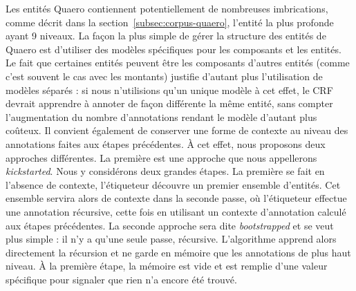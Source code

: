 \documentclass[12pt,a4paper,times,twoside,openright]{report}
\begin{document}
Les entités Quaero contiennent potentiellement de nombreuses imbrications, comme décrit dans la section\ \ref{subsec:corpus-quaero}, l'entité la plus profonde ayant 9 niveaux. La façon la plus simple de gérer la structure des entités de Quaero est d'utiliser des modèles spécifiques pour les composants et les entités. Le fait que certaines entités peuvent être les composants d'autres entités (comme c'est souvent le cas avec les montants) justifie d'autant plus l'utilisation de modèles séparés : si nous n'utilisions qu'un unique modèle à cet effet, le CRF devrait apprendre à annoter de façon différente la même entité, sans compter l'augmentation du nombre d'annotations rendant le modèle d'autant plus coûteux. Il convient également de conserver une forme de contexte au niveau des annotations faites aux étapes précédentes. À cet effet, nous proposons deux approches différentes. La première est une approche que nous appellerons \emph{kickstarted}. Nous y considérons deux grandes étapes. La première se fait en l'absence de contexte, l'étiqueteur découvre un premier ensemble d'entités. Cet ensemble servira alors de contexte dans la seconde passe, où l'étiqueteur effectue une annotation récursive, cette fois en utilisant un contexte d'annotation calculé aux étapes précédentes. La seconde approche sera dite \emph{bootstrapped} et se veut plus simple : il n'y a qu'une seule passe, récursive. L'algorithme apprend alors directement la récursion et ne garde en mémoire que les annotations de plus haut niveau. À la première étape, la mémoire est vide et est remplie d'une valeur spécifique pour signaler que rien n'a encore été trouvé. %
\end{document}
